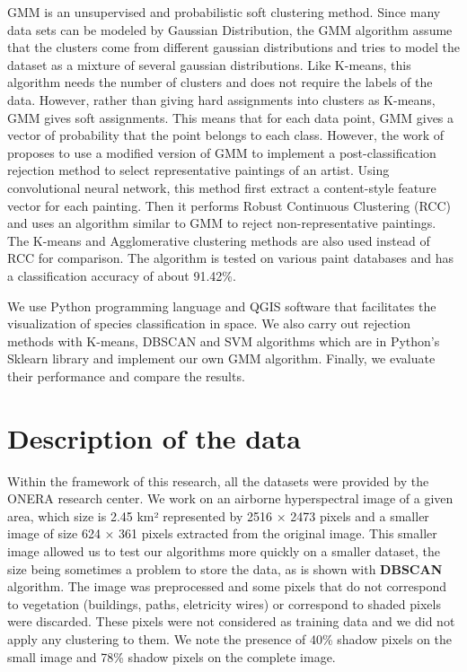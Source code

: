 \documentclass{siamart171218}
\begin{document}
GMM is an unsupervised and probabilistic soft clustering method. Since many data sets can be modeled by Gaussian Distribution, the GMM algorithm assume that the clusters come from different gaussian distributions and tries to model the dataset as a mixture of several gaussian distributions. Like K-means, this algorithm needs the number of clusters and does not require the labels of the data. However, rather than giving hard assignments into clusters as K-means, GMM gives soft assignments. This means that for each data point, GMM gives  a vector of probability that the point belongs to each class.
However, the work of \cite {deng2019selective} proposes to use a modified version of GMM to implement a post-classification rejection method to select representative paintings of an artist. Using convolutional neural network, this method first extract a content-style feature vector for each painting. Then it performs Robust Continuous Clustering (RCC) and uses an algorithm similar to GMM to reject non-representative paintings. The K-means and Agglomerative clustering methods are also used instead of RCC for comparison. The algorithm is tested on various paint databases and has a classification accuracy of about 91.42\%.

We use Python programming language and QGIS software that facilitates the visualization of species classification in space. We also carry out rejection methods with K-means, DBSCAN and SVM algorithms which are in Python's Sklearn library and implement our own GMM algorithm. Finally, we evaluate their performance and compare the  results.


\section{Description of the data} 
Within the framework of this research, all the datasets were provided by the ONERA research center. We work on an airborne hyperspectral image of a given area, which size is 2.45 km² represented by 2516 × 2473 pixels and a smaller image of size 624 × 361 pixels extracted from the original image. This smaller image allowed us to test our algorithms more quickly on a smaller dataset, the size being sometimes a problem to store the data, as is shown with \textbf{DBSCAN} algorithm. The image was preprocessed and some pixels that do not correspond to vegetation (buildings, paths, eletricity wires) or correspond to shaded pixels were discarded. These pixels were not considered as training data and we did not apply any clustering to them. We note the presence of 40\% shadow pixels on the small image and 78\% shadow pixels on the complete image.
\end{document}
